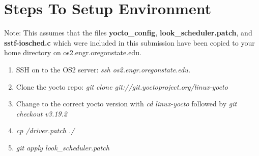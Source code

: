 \documentclass[onecolumn,draftclsnofoot, 10pt, compsoc]{IEEEtran}
\begin{document}
	\section{Steps To Setup Environment}
	Note: This assumes that the files \textbf{yocto\_config}, \textbf{look\_scheduler.patch}, and \textbf{sstf-iosched.c} which were included in this submission have been copied to your home directory on os2.engr.oregonstate.edu.
	\begin{enumerate}
		\item
		SSH on to the OS2 server: \textit{ssh os2.engr.oregonstate.edu. }
		\item
		Clone the yocto repo: \textit{git clone git://git.yoctoproject.org/linux-yocto}
		\item 
		Change to the correct yocto version with \textit{cd linux-yocto} followed by \textit{git checkout v3.19.2}
		\item 
		\textit{cp \texttildelow/driver.patch ./}
		\item 
		\textit{git apply look\_scheduler.patch}
	\end{enumerate}
	
	
\end{document}
